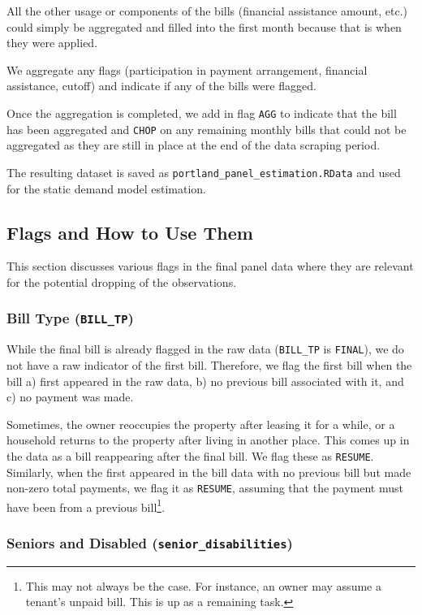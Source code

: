\documentclass[11pt]{article}
\begin{document}
All the other usage or components of the bills (financial assistance amount, etc.) could simply be aggregated and filled into the first month because that is when they were applied.

We aggregate any flags (participation in payment arrangement, financial assistance, cutoff) and indicate if any of the bills were flagged.

Once the aggregation is completed, we add in flag \texttt{AGG} to indicate that the bill has been aggregated and \texttt{CHOP} on any remaining monthly bills that could not be aggregated as they are still in place at the end of the data scraping period.

The resulting dataset is saved as \texttt{portland\_panel\_estimation.RData} and used for the static demand model estimation.

\subsection*{Flags and How to Use Them}

This section discusses various flags in the final panel data where they are relevant for the potential dropping of the observations.

\subsubsection*{Bill Type (\texttt{BILL\_TP})}

While the final bill is already flagged in the raw data (\texttt{BILL\_TP} is \texttt{FINAL}), we do not have a raw indicator of the first bill. Therefore, we flag the first bill when the bill a) first appeared in the raw data, b) no previous bill associated with it, and c) no payment was made.

Sometimes, the owner reoccupies the property after leasing it for a while, or a household returns to the property after living in another place. This comes up in the data as a bill reappearing after the final bill. We flag these as \texttt{RESUME}. Similarly, when the first appeared in the bill data with no previous bill but made non-zero total payments, we flag it as \texttt{RESUME}, assuming that the payment must have been from a previous bill\footnote{This may not always be the case. For instance, an owner may assume a tenant's unpaid bill. This is up as a remaining task.}.

\subsubsection*{Seniors and Disabled (\texttt{senior\_disabilities})}
\end{document}
